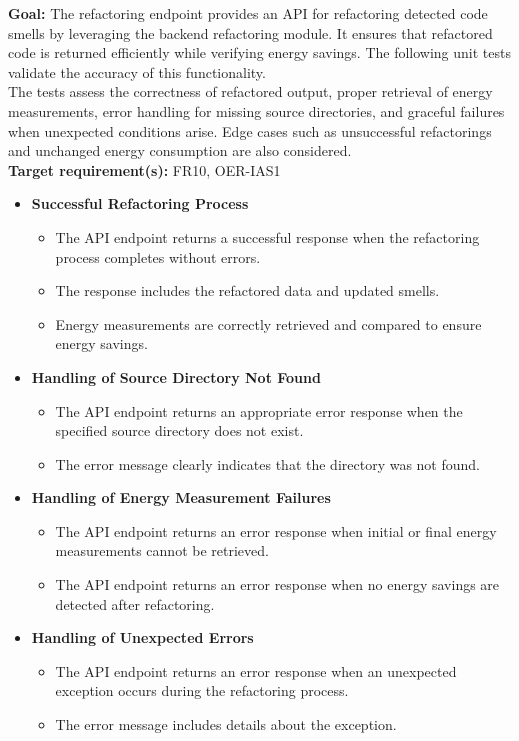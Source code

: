 \documentclass[12pt, titlepage]{article}
\begin{document}
\textbf{Goal:} The refactoring endpoint provides an API for refactoring detected code smells by leveraging the backend refactoring module. It ensures that refactored code is returned efficiently while verifying energy savings. The following unit tests validate the accuracy of this functionality.\\

\noindent The tests assess the correctness of refactored output, proper retrieval of energy measurements, error handling for missing source directories, and graceful failures when unexpected conditions arise. Edge cases such as unsuccessful refactorings and unchanged energy consumption are also considered.\\

\noindent\textbf{Target requirement(s):} FR10, OER-IAS1~\cite{SRS} \\

\begin{itemize}
    \item \textbf{Successful Refactoring Process}
    \begin{itemize}
        \item The API endpoint returns a successful response when the refactoring process completes without errors.
        \item The response includes the refactored data and updated smells.
        \item Energy measurements are correctly retrieved and compared to ensure energy savings.
    \end{itemize}

    \item \textbf{Handling of Source Directory Not Found}
    \begin{itemize}
        \item The API endpoint returns an appropriate error response when the specified source directory does not exist.
        \item The error message clearly indicates that the directory was not found.
    \end{itemize}

    \item \textbf{Handling of Energy Measurement Failures}
    \begin{itemize}
        \item The API endpoint returns an error response when initial or final energy measurements cannot be retrieved.
        \item The API endpoint returns an error response when no energy savings are detected after refactoring.
    \end{itemize}

    \item \textbf{Handling of Unexpected Errors}
    \begin{itemize}
        \item The API endpoint returns an error response when an unexpected exception occurs during the refactoring process.
        \item The error message includes details about the exception.
    \end{itemize}
\end{itemize}
\end{document}
